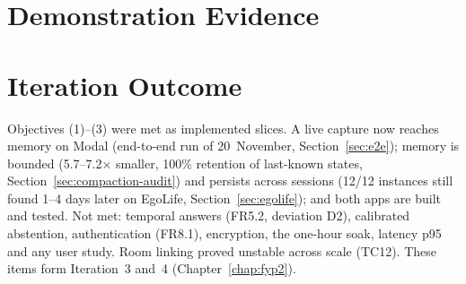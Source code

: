 \section{Demonstration Evidence}

\section{Iteration Outcome}
\label{sec:iter2-outcome}
Objectives (1)--(3) were met as implemented slices. A live capture now reaches
memory on Modal (end-to-end run of 20~November, Section~\ref{sec:e2e}); memory is
bounded (5.7--7.2$\times$ smaller, 100\% retention of last-known states,
Section~\ref{sec:compaction-audit}) and persists across sessions (12/12 instances
still found 1--4 days later on EgoLife, Section~\ref{sec:egolife}); and both apps
are built and tested. Not met: temporal answers (FR5.2, deviation D2),
calibrated abstention, authentication (FR8.1), encryption, the one-hour soak,
latency p95 and any user study. Room linking proved unstable across scale
(TC12). These items form Iteration~3 and~4 (Chapter~\ref{chap:fyp2}).
